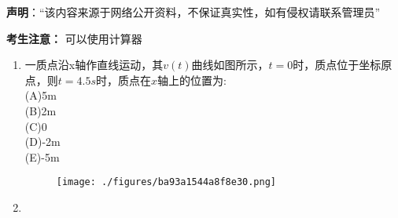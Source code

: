 
\textbf{声明}：“该内容来源于网络公开资料，不保证真实性，如有侵权请联系管理员”

\textbf{考生注意：}
可以使用计算器
\begin{enumerate}
\item 一质点沿x轴作直线运动，其$v(t)$曲线如图所示，$t=0$时，质点位于坐标原点，则$t=4.5s$时，质点在$x$轴上的位置为:\\
(A)5m\\
(B)2m\\
(C)0\\
(D)-2m\\
(E)-5m
\begin{figure}[ht]
\centering
\texttt{[image: ./figures/ba93a1544a8f8e30.png]}
\caption{} \label{fig_HDSD13_1}
\end{figure}
\item 
\end{enumerate}